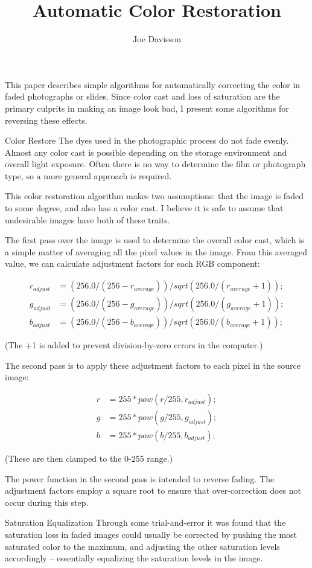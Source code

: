 \documentclass{article}
\title{Automatic Color Restoration}
\author{Joe Davisson} %
\begin{document}
\maketitle

This paper describes simple algorithms for automatically correcting the
color in faded photographs or slides. Since color cast and loss of
saturation are the primary culprits in making an image look bad, I
present some algorithms for reversing these effects.


Color Restore
The dyes used in the photographic process do not fade evenly. Almost any
color cast is possible depending on the storage environment and overall
light exposure. Often there is no way to determine the film or
photograph type, so a more general approach is required.

This color restoration algorithm makes two assumptions: that the image
is faded to some degree, and also has a color cast. I believe it is safe
to assume that undesirable images have both of these traits.

The first pass over the image is used to determine the overall color
cast, which is a simple matter of averaging all the pixel values in the
image. From this averaged value, we can calculate adjustment factors for
each RGB component:

\begin{align}
r_{adjust} &= (256.0 / (256 - r_{average})) / sqrt(256.0 / (r_{average} + 1)); \\
g_{adjust} &= (256.0 / (256 - g_{average})) / sqrt(256.0 / (g_{average} + 1)); \\
b_{adjust} &= (256.0 / (256 - b_{average})) / sqrt(256.0 / (b_{average} + 1));
\end{align}

(The +1 is added to prevent division-by-zero errors in the computer.)

The second pass is to apply these adjustment factors to each pixel in
the source image:

\begin{align}
r &= 255 * pow(r / 255, r_{adjust}); \\
g &= 255 * pow(g / 255, g_{adjust}); \\
b &= 255 * pow(b / 255, b_{adjust});
\end{align}

(These are then clamped to the 0-255 range.)

The power function in the second pass is intended to reverse fading. The
adjustment factors employ a square root to ensure that over-correction
does not occur during this step.


Saturation Equalization
Through some trial-and-error it was found that the saturation loss in
faded images could usually be corrected by pushing the most saturated
color to the maximum, and adjusting the other saturation levels
accordingly -- essentially equalizing the saturation levels in the image.
\end{document}
